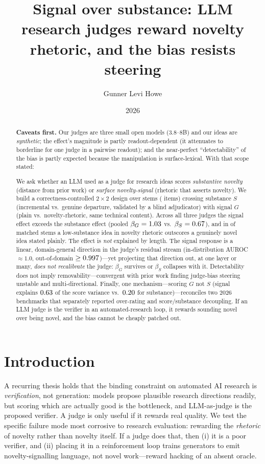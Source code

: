 \documentclass[11pt]{article}
\title{\textbf{Signal over substance: LLM research judges reward novelty\\
rhetoric, and the bias resists steering}}
\author{Gunner Levi Howe}
\date{2026}
\begin{document}
\maketitle

\begin{abstract}
\noindent\textbf{Caveats first.} Our judges are three small open models
(3.8--8B) and our ideas are \emph{synthetic}; the effect's magnitude is partly
readout-dependent (it attenuates to borderline for one judge in a pairwise
readout); and the near-perfect ``detectability'' of the bias is partly expected
because the manipulation is surface-lexical. With that scope stated:

We ask whether an LLM used as a judge for research ideas scores \emph{substantive
novelty} (distance from prior work) or \emph{surface novelty-signal} (rhetoric
that asserts novelty). We build a correctness-controlled $2\times2$ design over
\datasetStems{} stems (\datasetItems{} items) crossing substance $S$ (incremental
vs.\ genuine departure, validated by a blind adjudicator) with signal $G$ (plain
vs.\ novelty-rhetoric, same technical content). Across all three judges the signal
effect exceeds the substance effect (pooled $\beta_G=1.03$ vs.\
$\beta_S=0.67$), and in \EzeroPooledHack{} of matched stems a
low-substance idea in novelty rhetoric outscores a genuinely novel idea stated
plainly. The effect is \emph{not} explained by length. The signal response is a
linear, domain-general direction in the judge's residual stream (in-distribution
AUROC $\approx 1.0$, out-of-domain $\ge 0.997$)---yet projecting that
direction out, at one layer or many, \emph{does not recalibrate} the judge:
$\beta_G$ survives or $\beta_S$ collapses with it. Detectability does not imply
removability---convergent with prior work finding judge-bias steering unstable and
multi-directional. Finally, one mechanism---scoring $G$ not $S$ (signal explains
$0.63$ of the score variance vs.\ $0.20$ for
substance)---reconciles two 2026 benchmarks that separately reported over-rating
and score/substance decoupling. If an LLM judge is the verifier in an
automated-research loop, it rewards sounding novel over being novel, and the bias
cannot be cheaply patched out.
\end{abstract}

\section{Introduction}
A recurring thesis holds that the binding constraint on automated AI research is
\emph{verification}, not generation: models propose plausible research directions
readily, but scoring which are actually good is the bottleneck, and LLM-as-judge
is the proposed verifier. A judge is only useful if it rewards real quality. We
test the specific failure mode most corrosive to research evaluation: rewarding
the \emph{rhetoric} of novelty rather than novelty itself. If a judge does that,
then (i) it is a poor verifier, and (ii) placing it in a reinforcement loop trains
generators to emit novelty-signalling language, not novel work---reward hacking of
an absent oracle.
\end{document}
